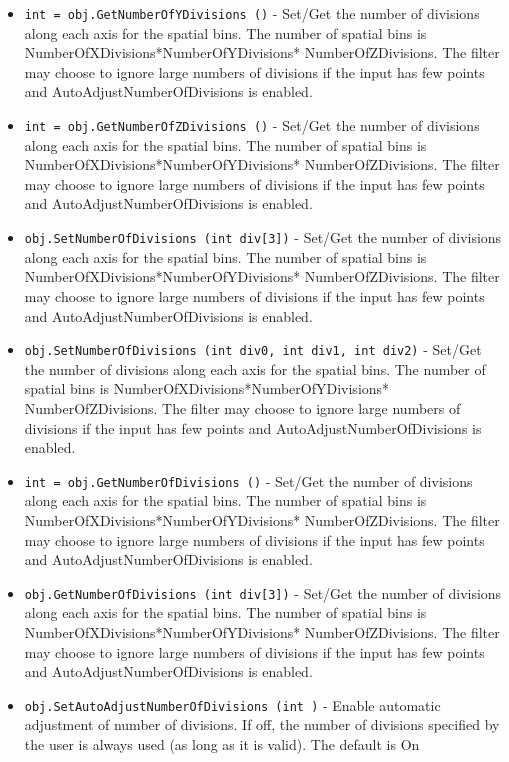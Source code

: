 \begin{itemize}
\item  \verb|int = obj.GetNumberOfYDivisions ()| -  Set/Get the number of divisions along each axis for the spatial bins.
 The number of spatial bins is NumberOfXDivisions*NumberOfYDivisions*
 NumberOfZDivisions.  The filter may choose to ignore large numbers of
 divisions if the input has few points and AutoAdjustNumberOfDivisions
 is enabled.

\item  \verb|int = obj.GetNumberOfZDivisions ()| -  Set/Get the number of divisions along each axis for the spatial bins.
 The number of spatial bins is NumberOfXDivisions*NumberOfYDivisions*
 NumberOfZDivisions.  The filter may choose to ignore large numbers of
 divisions if the input has few points and AutoAdjustNumberOfDivisions
 is enabled.

\item  \verb|obj.SetNumberOfDivisions (int div[3])| -  Set/Get the number of divisions along each axis for the spatial bins.
 The number of spatial bins is NumberOfXDivisions*NumberOfYDivisions*
 NumberOfZDivisions.  The filter may choose to ignore large numbers of
 divisions if the input has few points and AutoAdjustNumberOfDivisions
 is enabled.

\item  \verb|obj.SetNumberOfDivisions (int div0, int div1, int div2)| -  Set/Get the number of divisions along each axis for the spatial bins.
 The number of spatial bins is NumberOfXDivisions*NumberOfYDivisions*
 NumberOfZDivisions.  The filter may choose to ignore large numbers of
 divisions if the input has few points and AutoAdjustNumberOfDivisions
 is enabled.

\item  \verb|int = obj.GetNumberOfDivisions ()| -  Set/Get the number of divisions along each axis for the spatial bins.
 The number of spatial bins is NumberOfXDivisions*NumberOfYDivisions*
 NumberOfZDivisions.  The filter may choose to ignore large numbers of
 divisions if the input has few points and AutoAdjustNumberOfDivisions
 is enabled.

\item  \verb|obj.GetNumberOfDivisions (int div[3])| -  Set/Get the number of divisions along each axis for the spatial bins.
 The number of spatial bins is NumberOfXDivisions*NumberOfYDivisions*
 NumberOfZDivisions.  The filter may choose to ignore large numbers of
 divisions if the input has few points and AutoAdjustNumberOfDivisions
 is enabled.

\item  \verb|obj.SetAutoAdjustNumberOfDivisions (int )| -  Enable automatic adjustment of number of divisions. If off, the number
 of divisions specified by the user is always used (as long as it is valid).
 The default is On


\end{itemize}
